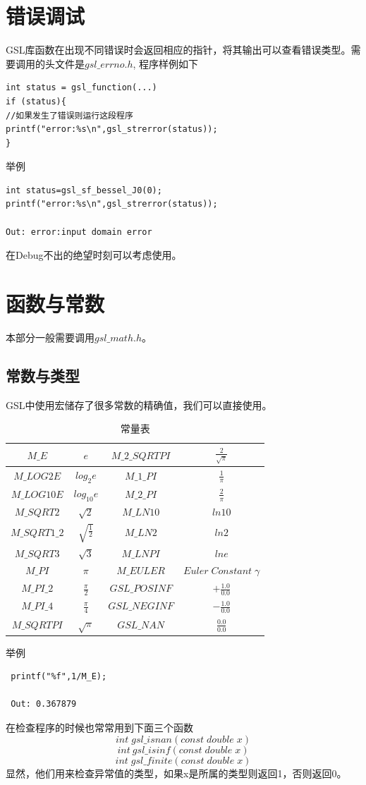 \documentclass[a4paper,11pt,onecolumn,twoside]{article}
\begin{document}
\section{错误调试}
GSL库函数在出现不同错误时会返回相应的指针，将其输出可以查看错误类型。需要调用的头文件是$gsl\_errno.h$, 程序样例如下
\begin{lstlisting}
int status = gsl_function(...)
if (status){
//如果发生了错误则运行这段程序
printf("error:%s\n",gsl_strerror(status));
}
\end{lstlisting}
\par
举例
\begin{lstlisting}
int status=gsl_sf_bessel_J0(0);
printf("error:%s\n",gsl_strerror(status));
    
Out: error:input domain error
\end{lstlisting}
在Debug不出的绝望时刻可以考虑使用。
\section{函数与常数}
本部分一般需要调用$gsl\_math.h$。\par
\subsection{常数与类型}
GSL中使用宏储存了很多常数的精确值，我们可以直接使用。
\begin{table}
\centering
\renewcommand\arraystretch{2}
\caption{常量表}
\begin{tabular}{|c|c|c|c|}
\hline
$M\_E$&$ e$&$ M\_2\_SQRTPI$&$ \frac{2}{\sqrt{\pi}}$\\\hline
$M\_LOG2E$&$ log_2{e}$&$ M\_1\_PI$&$ \frac{1}{\pi}$\\\hline
$M\_LOG10E$&$ log_{10}{e}$&$ M\_2\_PI$&$ \frac{2}{\pi}$\\\hline
$M\_SQRT2$&$ \sqrt{2}$&$ M\_LN10$&$ ln{10}$\\\hline
$M\_SQRT1\_2$&$ \sqrt{\frac{1}{2}}$&$ M\_LN2$&$ ln{2}$\\\hline
$M\_SQRT3$&$ \sqrt{3}$&$ M\_LNPI$&$ ln{e}$\\\hline
$M\_PI$&$ \pi$&$ M\_EULER$&$ Euler\;Constant\;\gamma$\\\hline
$M\_PI\_2$&$ \frac{\pi}{2}$&$ GSL\_POSINF$&$ +\frac{1.0}{0.0}$\\\hline
$M\_PI\_4$&$ \frac{\pi}{4}$&$ GSL\_NEGINF$&$ -\frac{1.0}{0.0}$\\\hline
$M\_SQRTPI$&$ \sqrt{\pi}$&$ GSL\_NAN$&$ \frac{0.0}{0.0}$\\\hline
\end{tabular}
\end{table}
举例
\begin{lstlisting}
 printf("%f",1/M_E);
 
 Out: 0.367879
\end{lstlisting}
在检查程序的时候也常常用到下面三个函数$$
int\;gsl\_isnan(const\;double \;x)
$$
$$
int\:gsl\_isinf(const\;double\; x)
$$
$$
int\;gsl\_finite(const\;double\; x)
$$
显然，他们用来检查异常值的类型，如果x是所属的类型则返回1，否则返回0。
\end{document}
